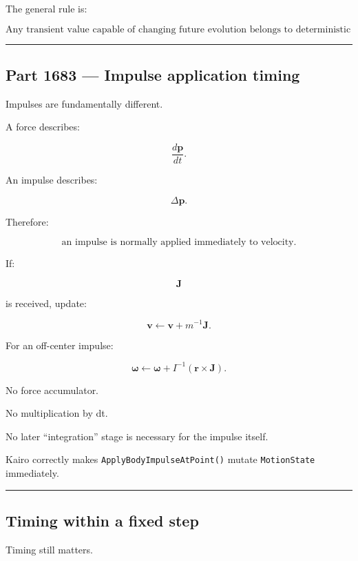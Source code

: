 The general rule is:

\[
\boxed{
\text{Any transient value capable of changing future evolution belongs to deterministic state at the instant it is captured.}
}
\]

\begin{center}\rule{0.5\linewidth}{0.5pt}\end{center}

\subsection{Part 1683 --- Impulse application timing}\label{06-engine-ii-ch038-part-1683-impulse-application-timing}

Impulses are fundamentally different.

A force describes:

\[
\frac{d\mathbf p}{dt}.
\]

An impulse describes:

\[
\Delta\mathbf p.
\]

Therefore:

\[
\boxed{
\text{an impulse is normally applied immediately to velocity.}
}
\]

If:

\[
\mathbf J
\]

is received, update:

\[
\mathbf v
\leftarrow
\mathbf v+m^{-1}\mathbf J.
\]

For an off-center impulse:

\[
\boldsymbol\omega
\leftarrow
\boldsymbol\omega+
I^{-1}
(\mathbf r\times\mathbf J).
\]

No force accumulator.

No multiplication by dt.

No later ``integration'' stage is necessary for the impulse itself.

Kairo correctly makes \texttt{ApplyBodyImpulseAtPoint()} mutate \texttt{MotionState} immediately.

\begin{center}\rule{0.5\linewidth}{0.5pt}\end{center}

\subsection{Timing within a fixed step}\label{06-engine-ii-ch038-timing-within-a-fixed-step}

Timing still matters.

